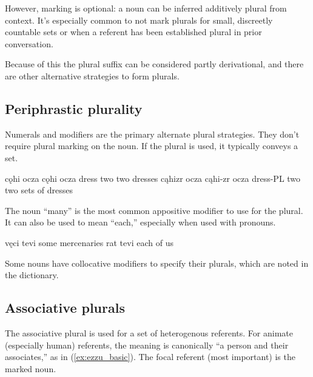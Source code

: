 However, marking is optional: a noun can be inferred additively plural from context.  It's especially common to not mark plurals for small, discreetly countable sets or when a referent has been established plural in prior conversation. 

Because of this the plural suffix can be considered partly derivational, and there are other alternative strategies to form plurals.

\subsection{Periphrastic plurality}
Numerals and modifiers are the primary alternate plural strategies. They don't require plural marking on the noun. If the plural is used, it typically conveys a set.

\begin{subexamples}
    \ex \script cǫhi ocza
    \bits cǫhi ocza
    \gloss dress two
    \tr two dresses
    \ex \script cąhizr ocza
    \bits cąhi-zr ocza
    \gloss dress-PL two
    \tr two sets of dresses
\end{subexamples}

The noun  “many” is the most common appositive modifier to use for the plural. It can also be used to mean “each,” especially when used with pronouns.

\begin{subexamples}
    \ex \label{ex:tevi_plural}
        \script vęci tevi
        \tr some mercenaries
    \ex
        \script rat tevi
        \tr each of us
\end{subexamples}

Some nouns have collocative modifiers to specify their plurals, which are noted in the dictionary.

\subsection{Associative plurals}
The associative plural is used for a set of heterogenous referents. For animate (especially human) referents, the meaning is canonically “a person and their associates,” as in (\ref{ex:ezzu_basic}). The focal referent (\ie most important) is the marked noun.

